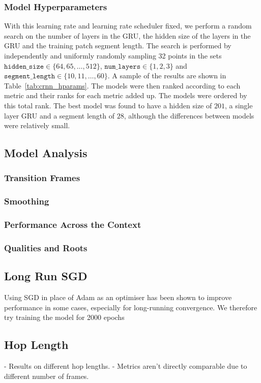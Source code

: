 \subsubsection{Model Hyperparameters}

With this learning rate and learning rate scheduler fixed, we perform a random search on the number of layers in the GRU, the hidden size of the layers in the GRU and the training patch segment length. The search is performed by independently and uniformly randomly sampling 32 points in the sets $\texttt{hidden\_size}\in\{64,65,\ldots,512\}$, $\texttt{num\_layers}\in\{1,2,3\}$ and $\texttt{segment\_length}\in\{10,11,\ldots,60\}$. A sample of the results are shown in Table~\ref{tab:crnn_hparams}. The models were then ranked according to each metric and their ranks for each metric added up. The models were ordered by this total rank. The best model was found to have a hidden size of $201$, a single layer GRU and a segment length of $28$, although the differences between models were relatively small.

\subsection{Model Analysis}
\subsubsection{Transition Frames}
\subsubsection{Smoothing}
\subsubsection{Performance Across the Context}
\subsubsection{Qualities and Roots}

\subsection{Long Run SGD}

Using SGD in place of Adam as an optimiser has been shown to improve performance in some cases, especially for long-running convergence. We therefore try training the model for 2000 epochs

\subsection{Hop Length}
- Results on different hop lengths.
- Metrics aren't directly comparable due to different number of frames.

